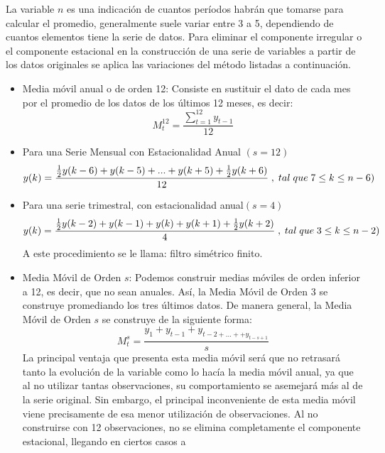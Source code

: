 \begin{itemize}
  La variable $n$ es una indicación de cuantos períodos habrán que tomarse para calcular el promedio, generalmente suele variar entre 3 a 5, dependiendo de cuantos elementos 
  tiene la serie de datos. Para eliminar el componente irregular o el componente estacional en la construcción de una serie de variables a partir de los datos originales se 
  aplica las variaciones del método listadas a continuación.
  \begin{itemize} 
   \item Media móvil anual o de orden 12: Consiste en sustituir el dato de cada mes por el promedio de los datos de los últimos 12 meses, es decir: 
    \begin{equation}
      M_t^{12}=\frac{\sum_{t=1}^{12} y_{t-1}}{12} 
    \end{equation}
   \item Para una Serie Mensual con Estacionalidad Anual $(s=12)$
    \begin{equation}
      \scriptsize{ y(k)=\frac{\frac{1}{2}y(k-6)+ y(k-5)+...+y(k+5)+\frac{1}{2}y(k+6)}{12}}\ ,\ tal\ que\ 7 \leq k \leq n-6)
    \end{equation}
   \item Para una serie trimestral, con estacionalidad anual$(s=4)$
    \begin{equation}
      \scriptsize{ y(k)=\frac{\frac{1}{2}y(k-2)+ y(k-1)+y(k)+y(k+1)+\frac{1}{2}y(k+2)}{4}}\ ,\ tal\ que\ 3 \leq k \leq n-2)
    \end{equation}
    A este procedimiento se le llama: filtro simétrico finito.
   \item Media Móvil de Orden $s$:  Podemos construir medias móviles de orden inferior a 12, es decir, que no sean anuales. Así, la Media Móvil de Orden 3 se construye 
    promediando los tres últimos datos. De manera general, la Media Móvil de Orden $s$ se construye de la siguiente forma:
    \begin{equation}
      M_t^{s}=\frac{y_1+y_{t-1}+y_{t-2+...++y_{t-s+1}}}{s} 
    \end{equation}
    La principal ventaja que presenta esta media móvil será que no retrasará tanto la evolución de la variable como lo hacía la media móvil anual, ya que al no utilizar 
    tantas observaciones, su comportamiento se asemejará más al de la serie original. Sin embargo, el principal inconveniente de esta media móvil viene precisamente de esa 
    menor utilización de observaciones. Al no construirse con 12 observaciones, no se elimina completamente el componente estacional, llegando en ciertos casos a 

\end{itemize}
\end{itemize}
